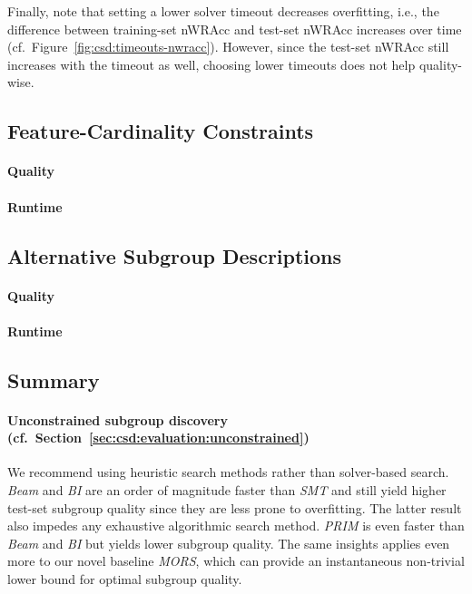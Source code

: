 \documentclass{article}
\theoremstyle{definition}
\begin{document}
Finally, note that setting a lower solver timeout decreases overfitting, i.e., the difference between training-set nWRAcc and test-set nWRAcc increases over time (cf.~Figure~\ref{fig:csd:timeouts-nwracc}).
However, since the test-set nWRAcc still increases with the timeout as well, choosing lower timeouts does not help quality-wise.

\subsection{Feature-Cardinality Constraints}
\label{sec:csd:evaluation:cardinality}

\paragraph{Quality}

\paragraph{Runtime}

\subsection{Alternative Subgroup Descriptions}
\label{sec:csd:evaluation:alternatives}

\paragraph{Quality}

\paragraph{Runtime}

\subsection{Summary}
\label{sec:csd:evaluation:summary}

\paragraph{Unconstrained subgroup discovery (cf.~Section~\ref{sec:csd:evaluation:unconstrained})}

We recommend using heuristic search methods rather than solver-based search.
\emph{Beam} and \emph{BI} are an order of magnitude faster than \emph{SMT} and still yield higher test-set subgroup quality since they are less prone to overfitting.
The latter result also impedes any exhaustive algorithmic search method.
\emph{PRIM} is even faster than \emph{Beam} and \emph{BI} but yields lower subgroup quality.
The same insights applies even more to our novel baseline \emph{MORS}, which can provide an instantaneous non-trivial lower bound for optimal subgroup quality.
\end{document}
